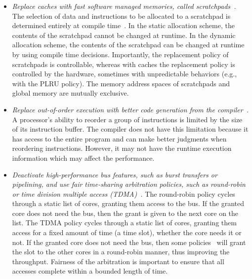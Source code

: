 \begin{itemize}
	\item \emph{Replace caches with fast software managed memories, called scratchpads~\cite{memory_scratchpad_predictable}.}
		  The selection of data and instructions to be allocated to a scratchpad is determined entirely at 
		  compile time~\cite{memory_scratchpad_known_size,memory_scratchpad_concurrent_allocation,KimBCS14,PrakashP13a,memory_scratchpad_unknown_size}. 
		  In the static allocation scheme, the contents of the scratchpad cannot be changed at runtime. In the
		  dynamic allocation scheme, the contents of the scratchpad can be changed at runtime by using compile time decisions.
		  Importantly, the replacement policy of scratchpads is controllable, whereas with caches the replacement policy is controlled by 
		  the hardware, sometimes with unpredictable behaviors (e.g., with the PLRU policy).
		  The memory address spaces of scratchpads and global memory are mutually exclusive. 
		
	\item \emph{Replace out-of-order execution with better code generation from the compiler~\cite{wcet_aware_framework,SchranzhoferPCTC11,memory_multicore_code_positioning,memory_shared_cache_aware_wcrt,pret_merasa}.}
		  A processor's ability to reorder a group of instructions is limited by the size of
		  its instruction buffer. The compiler does not have this limitation because
		  it has access to the entire program and can make better judgments when reordering
		  instructions. However, it may not have the runtime execution information which may affect the performance.

	\item \emph{Deactivate high-performance bus features, such as burst transfers or pipelining, 
		  and use fair time-sharing arbitration policies, such as round-robin or time
		  division multiple access (TDMA)~\cite{memory_tdma_priority_division}.}
		  The round-robin policy cycles through a static list of 
		  cores, granting them access to the bus. If the granted core does not need the bus, then
		  the grant is given to the next core on the list. The TDMA policy cycles through
		  a static list of cores, granting them access for a fixed amount of time 
		  (a time slot), whether the core needs it or not. 
		  If the granted core does not need the bus, then some 
		  policies~\cite{memory_tdma_priority_division,memory_buses,memory_tdma_lottery,memory_arbitration_performance,HamannE05} will 
		  grant the slot to the other cores in a round-robin manner, thus 
		  improving the throughput. Fairness of the arbitration is important to ensure 
		  that all accesses complete within a bounded length of time.
\end{itemize}

